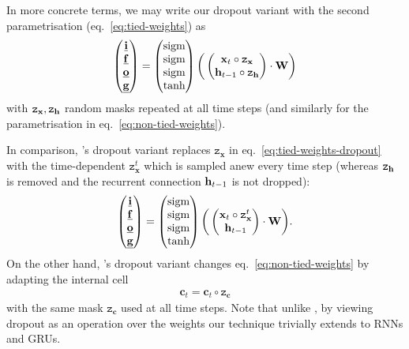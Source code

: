 \documentclass{article}
\renewcommand{\c}{\mathbf{c}}
\newcommand{\f}{\mathbf{f}}
\newcommand{\x}{\mathbf{x}}
\newcommand{\W}{\mathbf{W}}
\theoremstyle{definition}
\begin{document}
\newcommand{\bd}{\mathtt{z}}
In more concrete terms, we may write our dropout variant with the second parametrisation (eq.\ \eqref{eq:tied-weights}) as 
\begin{align}\label{eq:tied-weights-dropout}
\begin{pmatrix}
\underline{\i} \\
\underline{\f} \\
\underline{\o} \\
\underline{\g}
\end{pmatrix}
=
\begin{pmatrix}
\text{sigm} \\
\text{sigm} \\
\text{sigm} \\
\text{tanh}
\end{pmatrix}
\bigg( 
\begin{pmatrix}
\x_t \circ \bd_\x \\
\h_{t-1} \circ \bd_\h
\end{pmatrix}
\cdot
\W
\bigg)
\end{align}
with $\bd_\x, \bd_\h$ random masks repeated at all time steps (and similarly for the parametrisation in eq.\ \eqref{eq:non-tied-weights}). 






In comparison, \citet{zaremba2014recurrent}'s dropout variant replaces $\bd_\x$ in eq.\ \eqref{eq:tied-weights-dropout} with the time-dependent $\bd_\x^t$ which is sampled anew every time step (whereas $\bd_\h$ is removed and the recurrent connection $\mathbf{h}_{t-1}$ is not dropped):
\begin{align}\label{eq:tied-weights-naive-dropout}
\begin{pmatrix}
\underline{\i} \\
\underline{\f} \\
\underline{\o} \\
\underline{\g}
\end{pmatrix}
=
\begin{pmatrix}
\text{sigm} \\
\text{sigm} \\
\text{sigm} \\
\text{tanh}
\end{pmatrix}
\bigg( 
\begin{pmatrix}
\x_t \circ \bd_\x^t \\
\h_{t-1}
\end{pmatrix}
\cdot
\W
\bigg).
\end{align}
On the other hand, \citet{moon2015rnndrop}'s dropout variant changes eq.\ \eqref{eq:non-tied-weights} by adapting the internal cell 
\begin{align}\label{eq:tied-weights-rnn-dropout}
\c_t = \c_t \circ \bd_\c
\end{align}
with the same mask $\bd_\c$ used at all time steps. Note that unlike \citep{moon2015rnndrop}, by viewing dropout as an operation over the weights our technique trivially extends to RNNs and GRUs.
\end{document}
